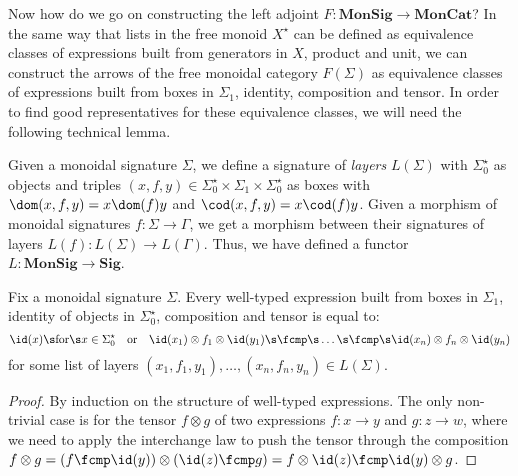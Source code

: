Now how do we go on constructing the left adjoint $F : \mathbf{MonSig} \to \mathbf{MonCat}$?
In the same way that lists in the free monoid $X^\star$ can be defined as equivalence classes of expressions built from generators in $X$, product and unit, we can construct the arrows of the free monoidal category $F(\Sigma)$ as equivalence classes of expressions built from boxes in $\Sigma_1$, identity, composition and tensor.
In order to find good representatives for these equivalence classes, we will need the following technical lemma.

\begin{definition}
Given a monoidal signature $\Sigma$, we define a signature of \emph{layers} $L(\Sigma)$ with $\Sigma_0^\star$ as objects and triples $(x, f, y) \in \Sigma_0^\star \times \Sigma_1 \times \Sigma_0^\star$ as boxes with $\dom(x, f, y) = x \dom(f) y$ and $\cod(x, f, y) = x \cod(f) y$.
Given a morphism of monoidal signatures $f : \Sigma \to \Gamma$, we get a morphism between their signatures of layers $L(f) : L(\Sigma) \to L(\Gamma)$.
Thus, we have defined a functor $L : \mathbf{MonSig} \to \mathbf{Sig}$.
\end{definition}

\begin{lemma}
Fix a monoidal signature $\Sigma$.
Every well-typed expression built from boxes in $\Sigma_1$, identity of objects in $\Sigma_0^\star$, composition and tensor is equal to:
$$
\id(x) \s \text{for} \s x \in \Sigma_0^\star \quad \text{or} \quad
\id(x_1) \otimes f_1 \otimes \id(y_1)
\s \fcmp \s \dots \s \fcmp \s
\id(x_n) \otimes f_n \otimes \id(y_n)$$
for some list of layers $(x_1, f_1, y_1), \dots, (x_n, f_n, y_n) \in L(\Sigma)$.
\end{lemma}

\begin{proof}
By induction on the structure of well-typed expressions.
The only non-trivial case is for the tensor $f \otimes g$ of two expressions $f : x \to y$ and $g : z \to w$, where we need to apply the interchange law to push the tensor through the composition $f \otimes g = (f \fcmp \id(y)) \otimes (\id(z) \fcmp g) = f \otimes \id(z) \fcmp \id(y) \otimes g$.
\end{proof}

